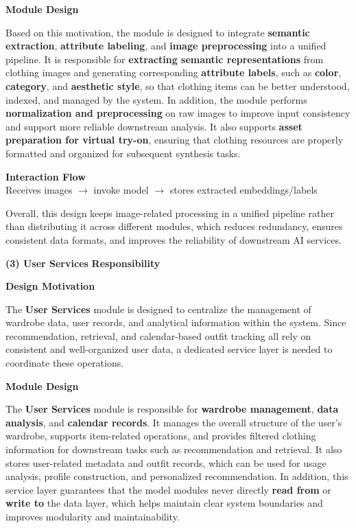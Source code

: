 \textbf{Module Design} 

Based on this motivation, the module is designed to integrate \textbf{semantic extraction}, \textbf{attribute labeling}, and \textbf{image preprocessing} into a unified pipeline. It is responsible for \textbf{extracting semantic representations} from clothing images and generating corresponding \textbf{attribute labels}, such as \textbf{color}, \textbf{category}, and \textbf{aesthetic style}, so that clothing items can be better understood, indexed, and managed by the system. In addition, the module performs \textbf{normalization and preprocessing} on raw images to improve input consistency and support more reliable downstream analysis. It also supports \textbf{asset preparation for virtual try-on}, ensuring that clothing resources are properly formatted and organized for subsequent synthesis tasks.


\textbf{Interaction Flow}\\
Receives images $\rightarrow$ invoke model $\rightarrow$ stores extracted embeddings/labels

Overall, this design keeps image-related processing in a unified pipeline rather than distributing it across different modules, which reduces redundancy, ensures consistent data formats, and improves the reliability of downstream AI services.

\vspace{0.5cm}

\textbf{\large (3) User Services}
\textbf{Responsibility}

\textbf{Design Motivation} 

The \textbf{User Services} module is designed to centralize the management of wardrobe data, user records, and analytical information within the system. Since recommendation, retrieval, and calendar-based outfit tracking all rely on consistent and well-organized user data, a dedicated service layer is needed to coordinate these operations.

\textbf{Module Design} 

The \textbf{User Services} module is responsible for \textbf{wardrobe management}, \textbf{data analysis}, and \textbf{calendar records}. It manages the overall structure of the user's wardrobe, supports item-related operations, and provides filtered clothing information for downstream tasks such as recommendation and retrieval. It also stores user-related metadata and outfit records, which can be used for usage analysis, profile construction, and personalized recommendation. In addition, this service layer guarantees that the model modules never directly \textbf{read from} or \textbf{write to} the data layer, which helps maintain clear system boundaries and improves modularity and maintainability.

